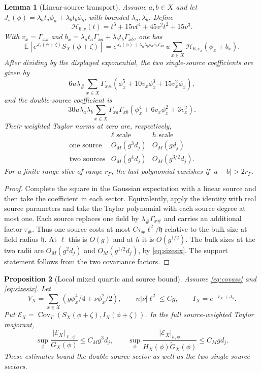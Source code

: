 \documentclass[11pt]{article}
\newtheorem{proposition}{Proposition}[section]
\newtheorem{lemma}[proposition]{Lemma}
\newcommand{\E}{\mathbb E}
\newcommand{\Cov}{\operatorname{Cov}}
\begin{document}
\begin{lemma}[Linear-source transport]\label{lem:wick}
Assume \(a,b\in X\) and let \(J_s(\phi)=\lambda_a t_a\phi_a+\lambda_b t_b\phi_b\), with bounded \(\lambda_a,\lambda_b\). Define
\[
 \mathcal H_{6,v}(t)=t^6+15vt^4+45v^2t^2+15v^3 .
\]
With \(v_x=\Gamma_{xx}\) and \(b_x=\lambda_a t_a\Gamma_{xa}+\lambda_b t_b\Gamma_{xb}\), one has
\begin{equation}\label{eq:wickshift}
 \E\left[e^{J_s(\phi+\zeta)} S_X(\phi+\zeta)\right]
 = e^{J_s(\phi)+\lambda_a\lambda_b s_as_b\Gamma_{ab}}\,
       u\sum_{x\in X}\mathcal H_{6,v_x}(\phi_x+b_x).
\end{equation}
After dividing by the displayed exponential, the two single-source coefficients are given by
\[
 6u\lambda_\#\sum_{x\in X}\Gamma_{x\#}
             (\phi_x^5+10v_x\phi_x^3+15v_x^2\phi_x),
\]
and the double-source coefficient is
\[
 30u\lambda_a\lambda_b\sum_{x\in X}\Gamma_{xa}\Gamma_{xb}
             (\phi_x^4+6v_x\phi_x^2+3v_x^2).
\]
Their weighted Taylor norms at zero are, respectively,
\[
 \begin{array}{c|cc}
  & \ell\text{ scale} & h\text{ scale}\\ \hline
  \text{one source}&O_M(g^3d_j)&O_M(gd_j)\\
  \text{two sources}&O_M(g^4d_j)&O_M(g^{3/2}d_j).
 \end{array}
\]
For a finite-range slice of range \(r_\Gamma\), the last polynomial vanishes if \(|a-b|>2r_\Gamma\).
\end{lemma}

\begin{proof}
Complete the square in the Gaussian expectation with a linear source and then take the coefficient in each sector. Equivalently, apply the identity with real source parameters and take the Taylor polynomial with each source degree at most one. Each source replaces one field by \(\lambda_\#\Gamma_{x\#}\) and carries an additional factor \(\tau_\#\). Thus one source costs at most \(C\tau_\#\ell^2/\mathfrak h\) relative to the bulk size at field radius \(\mathfrak h\). At \(\ell\) this is \(O(g)\) and at \(h\) it is \(O(g^{1/2})\). The bulk sizes at the two radii are \(O_M(g^2d_j)\) and \(O_M(g^{1/2}d_j)\), by \eqref{eq:sizesix}. The support statement follows from the two covariance factors.
\end{proof}

\begin{proposition}[Local mixed quartic and source bound]\label{prop:mixed}
Assume \eqref{eq:covass} and \eqref{eq:sizesix}. Let
\[
 V_X=\sum_{x\in X}(g\phi_x^4/4+\nu\phi_x^2/2),\qquad
 n|\nu|\ell^2\le Cg,\qquad I_X=e^{-V_X+J_s}.
\]
Put \(\mathcal E_X=\Cov_\Gamma(S_X(\phi+\zeta), I_X(\phi+\zeta))\).
In the full source-weighted Taylor majorant,
\[
 \sup_\phi \frac{|\mathcal E_X|_{\ell,\phi}}{G_X(\phi)}
 \le C_M g^3d_j,\qquad
 \sup_\phi \frac{|\mathcal E_X|_{h,\phi}}{H_X(\phi)\widetilde G_X(\phi)}
 \le C_M gd_j.
\]
These estimates bound the double-source sector as well as the two single-source sectors.
\end{proposition}
\end{document}
